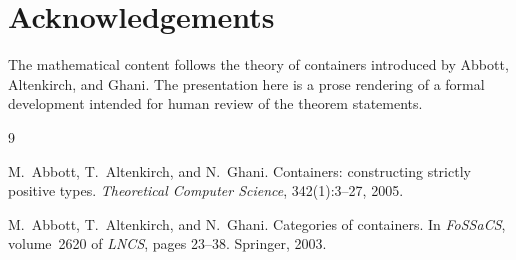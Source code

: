 \documentclass[11pt,a4paper]{article}
\theoremstyle{plain}
\theoremstyle{definition}
\begin{document}
\section*{Acknowledgements}

The mathematical content follows the theory of containers introduced by
Abbott, Altenkirch, and Ghani. The presentation here is a prose rendering of a
formal development intended for human review of the theorem statements.

\begin{thebibliography}{9}

M.~Abbott, T.~Altenkirch, and N.~Ghani.
\newblock Containers: constructing strictly positive types.
\newblock \emph{Theoretical Computer Science}, 342(1):3--27, 2005.

M.~Abbott, T.~Altenkirch, and N.~Ghani.
\newblock Categories of containers.
\newblock In \emph{FoSSaCS}, volume~2620 of \emph{LNCS}, pages 23--38.
\newblock Springer, 2003.

\end{thebibliography}
\end{document}
